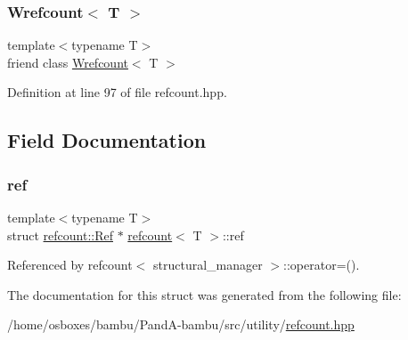\subsubsection{\texorpdfstring{Wrefcount$<$ T $>$}{Wrefcount< T >}}
{\footnotesize\ttfamily template$<$typename T$>$ \\
friend class \hyperlink{classWrefcount}{Wrefcount}$<$ T $>$\hspace{0.3cm}{\ttfamily [friend]}}



Definition at line 97 of file refcount.\+hpp.



\subsection{Field Documentation}
\mbox{\label{structrefcount_aee0abaeb5f1d12f6088d926b52fd7334}} 
\subsubsection{\texorpdfstring{ref}{ref}}
{\footnotesize\ttfamily template$<$typename T$>$ \\
struct \hyperlink{structrefcount_1_1Ref}{refcount\+::\+Ref} $\ast$  \hyperlink{structrefcount}{refcount}$<$ T $>$\+::ref\hspace{0.3cm}{\ttfamily [private]}}



Referenced by refcount$<$ structural\+\_\+manager $>$\+::operator=().



The documentation for this struct was generated from the following file\+:\begin{DoxyCompactItemize}
\item 
/home/osboxes/bambu/\+Pand\+A-\/bambu/src/utility/\hyperlink{refcount_8hpp}{refcount.\+hpp}\end{DoxyCompactItemize}
